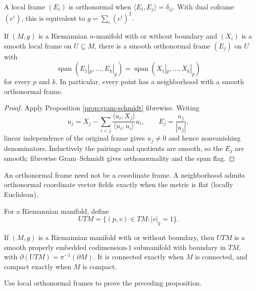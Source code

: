 A local frame $(E_i)$ is orthonormal when $\langle E_i,E_j\rangle=\delta_{ij}$. With dual coframe $(e^i)$, this is equivalent to $g=\sum_i(e^i)^2$.

\begin{proposition}
\label{prop:existence-orthonormal-frames}
\leanok
{}
If $(M,g)$ is a Riemannian $n$-manifold with or without boundary and $(X_i)$ is a smooth local frame on $U\subseteq M$, there is a smooth orthonormal frame $(E_j)$ on $U$ with
\[
\operatorname{span}(E_1|_p,\ldots,E_k|_p)=\operatorname{span}(X_1|_p,\ldots,X_k|_p)
\]
for every $p$ and $k$. In particular, every point has a neighborhood with a smooth orthonormal frame.
\end{proposition}
\begin{proof}
\leanok
{}
\sketch Apply Proposition \ref{prop:gram-schmidt} fibrewise. Writing
\[
u_j=X_j-\sum_{i<j}\frac{\langle u_i,X_j\rangle}{\langle u_i,u_i\rangle}u_i,
\qquad E_j=\frac{u_j}{|u_j|},
\]
linear independence of the original frame gives $u_j\ne0$ and hence nonvanishing denominators. Inductively the pairings and quotients are smooth, so the $E_j$ are smooth; fibrewise Gram--Schmidt gives orthonormality and the span flag.
\end{proof}

\begin{remark}
\label{rem:coordinate-frame-warning}
An orthonormal frame need not be a coordinate frame. A neighborhood admits orthonormal coordinate vector fields exactly when the metric is flat (locally Euclidean).
\end{remark}

For a Riemannian manifold, define
\[
UTM=\{(p,v)\in TM:|v|_g=1\}.\tag{2.10}
\]
\begin{proposition}
\label{prop:unit-tangent-bundle-properties}
If $(M,g)$ is a Riemannian manifold with or without boundary, then $UTM$ is a smooth properly embedded codimension-$1$ submanifold with boundary in $TM$, with $\partial(UTM)=\pi^{-1}(\partial M)$. It is connected exactly when $M$ is connected, and compact exactly when $M$ is compact.
\end{proposition}
\begin{exercise}
\label{exer:orthonormal-frames-proposition}
Use local orthonormal frames to prove the preceding proposition.
\end{exercise}

